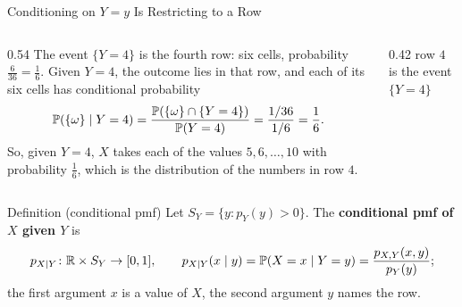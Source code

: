 \begin{frame}{Conditioning on $Y=y$ Is Restricting to a Row}
  \small
  \label{condpmf}%
  \begin{columns}[T]
    \begin{column}{0.54\textwidth}
      The event $\{Y=4\}$ is the fourth row: six cells, probability $\tfrac6{36}=\tfrac16$.
      Given $Y=4$, the outcome lies in that row, and each of its six cells has conditional probability
      \[
        \mathbb{P}(\{\omega\}\mid Y=4)=\frac{\mathbb{P}(\{\omega\}\cap\{Y=4\})}{\mathbb{P}(Y=4)}=\frac{1/36}{1/6}=\frac16 .
      \]
      So, given $Y=4$, $X$ takes each of the values $5,6,\dots,10$ with probability $\tfrac16$, which is the distribution of the numbers in row $4$.
    \end{column}
    \begin{column}{0.42\textwidth}
      \centering
      row $4$ is the event $\{Y=4\}$\par\medskip
    \end{column}
  \end{columns}
  \begin{block}{Definition (conditional pmf)}
    Let $S_Y=\{y : p_Y(y)>0\}$. The \textbf{conditional pmf of $X$ given $Y$} is
    \[
      p_{X\mid Y}\colon\mathbb{R}\times S_Y\to[0,1],\qquad p_{X\mid Y}(x\mid y)=\mathbb{P}(X=x\mid Y=y)=\frac{p_{X,Y}(x,y)}{p_Y(y)} ;
    \]
    the first argument $x$ is a value of $X$, the second argument $y$ names the row.
  \end{block}
\end{frame}

